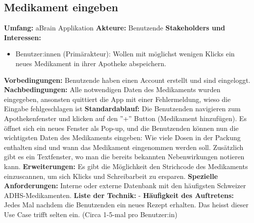 \subsection{Medikament eingeben}
\textbf{Umfang:} aBrain Applikation \newline \newline
\textbf{Akteure:} Benutzende \newline \newline
\textbf{Stakeholders und Interessen:}  
\begin{itemize}
	\item Benutzer:innen (Primärakteur): Wollen mit möglichst wenigen Klicks ein neues Medikament in ihrer Apotheke abspeichern.
\end{itemize}
\textbf{Vorbedingungen:} Benutzende haben einen Account erstellt und sind eingeloggt. \newline \newline
\textbf{Nachbedingungen:} Alle notwendigen Daten des Medikaments wurden eingegeben, ansonsten quittiert die App mit einer Fehlermeldung, wieso die Eingabe fehlgeschlagen ist \newline \newline
\textbf{Standardablauf:} Die Benutzenden navigieren zum Apothekenfenster und klicken auf den ''+'' Button (Medikament hinzufügen). Es öffnet sich ein neues Fenster als Pop-up, und die Benutzenden können nun die wichtigsten Daten des Medikaments eingeben: Wie viele Dosen in der Packung enthalten sind und wann das Medikament eingenommen werden soll. Zusätzlich gibt es ein Textfenster, wo man die bereits bekannten Nebenwirkungen notieren kann.  \newline \newline
\textbf{Erweiterungen:} Es gibt die Möglichkeit den Strichcode des Medikaments einzuscannen, um sich Klicks und Schreibarbeit zu ersparen. \newline \newline
\textbf{Spezielle Anforderungen:} Interne oder externe Datenbank mit den häufigsten Schweizer ADHS-Medikamenten. \newline \newline
\textbf{Liste der Technik:} - \newline \newline
\textbf{Häufigkeit des Auftretens:} Jedes Mal nachdem die Benutzenden ein neues Rezept erhalten. Das heisst dieser Use Case trifft selten ein. (Circa 1-5-mal pro Benutzer:in) \newline \newline

